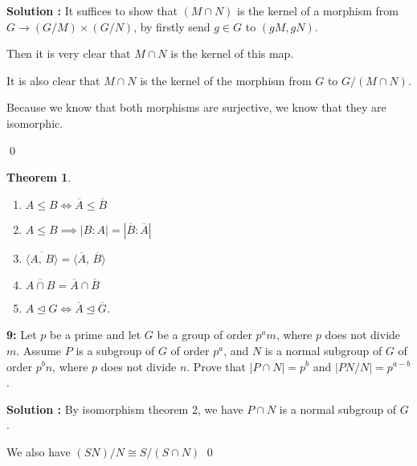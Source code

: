 \documentclass[11pt]{article}
\newcommand{\iprod}[2]{\langle #1,\, #2\rangle}
\newenvironment{exercise}[1]
	{\noindent \textbf{#1:}}
	{\par \vspace{0.5\baselineskip}}
\newenvironment{solution}[1][\unskip]
	{\noindent \textbf{Solution #1:} }
	{\qed \pagebreak}
\newtheorem{theorem}{Theorem}
\begin{document}
\begin{solution}
	It suffices to show that $(M \cap N)$ is the kernel of
	a morphism from $G \to (G / M) \times (G / N)$, by firstly send
	$g \in G$ to $(gM, gN)$.

	Then it is very clear that $M \cap N$ is the kernel of this map.

	It is also clear that $M\cap N$ is the kernel of the morphism from $G$ to $G/(M \cap N)$.

	Because we know that both morphisms are surjective, we know that they are isomorphic.

\end{solution}

\begin{theorem}
	\begin{enumerate}
		\item $A \le B \iff \overline{A} \le \overline{B}$
		\item $A \le B \implies |B:A| = |\overline{B} : \overline{A}|$
		\item $\overline{\iprod{A}{B}} = \iprod{\overline{A}}{\overline{B}}$
		\item $\overline{A \cap B} = \overline{A}\cap \overline{B}$
		\item $A \trianglelefteq G \iff \overline{A} \trianglelefteq \overline{G}$.
	\end{enumerate}
\end{theorem}

\begin{exercise}{9}
	Let $p$ be a prime and let $G$ be a group of order $p^am$,
	where $p$ does not divide $m$.
	Assume $P$ is a subgroup of $G$ of order $p^a$,
	and $N$ is a normal subgroup of $G$ of order $p^bn$,
	where $p$ does not divide $n$.
	Prove that $|P \cap N| = p^b$ and $|PN / N| = p^{a-b}$.
\end{exercise}

\begin{solution}
	By isomorphism theorem 2,
	we have $P \cap N$ is a normal subgroup of $G$.

	We also have $(SN) / N \cong S / (S\cap N)$
\end{solution}
\end{document}
